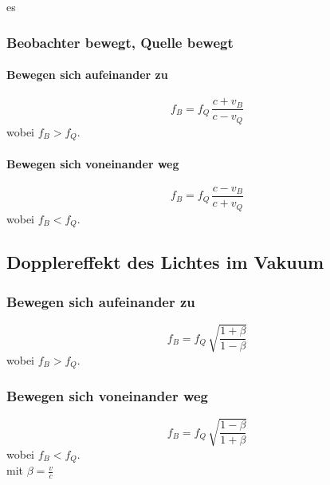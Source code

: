 es\documentclass[a4paper, fontsize=8pt, landscape]{scrartcl}
\begin{document}
\begin{multicols*}{4}
\subsubsection{Beobachter bewegt, Quelle bewegt}
\paragraph{Bewegen sich aufeinander zu}
\[\boxed{f_B = f_Q \,\frac{c + v_B}{c - v_Q}}\]
wobei \(f_B > f_Q\).\\

\paragraph{Bewegen sich voneinander weg}
\[\boxed{f_B = f_Q \,\frac{c - v_B}{c + v_Q}}\]
wobei \(f_B < f_Q\). \\


\subsection{Dopplereffekt des Lichtes im Vakuum}
\subsubsection{Bewegen sich aufeinander zu}
\[\boxed{f_B = f_Q \,\sqrt{\frac{1 + \beta}{1 - \beta}}}\]
wobei \(f_B > f_Q\).\\

\subsubsection{Bewegen sich voneinander weg}
\[\boxed{f_B = f_Q \,\sqrt{\frac{1 - \beta}{1 + \beta}}}\]
wobei \(f_B < f_Q\). \\
mit \(\beta = \frac{v}{c}\)

\columnbreak

\end{multicols*}
\end{document}

